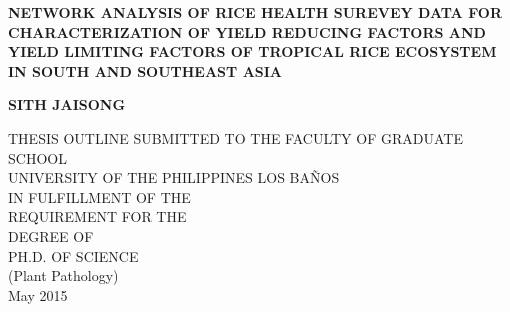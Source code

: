 \pagestyle{empty}

\begin{titlepage}
        \begin{center}
        \vspace*{2.0cm}

        \normalsize
        {\bf NETWORK ANALYSIS OF RICE HEALTH SUREVEY DATA FOR CHARACTERIZATION OF YIELD REDUCING FACTORS AND YIELD LIMITING FACTORS OF TROPICAL RICE ECOSYSTEM IN SOUTH AND SOUTHEAST ASIA}

        \vspace*{4.0cm}

        \normalsize
        \bf{SITH JAISONG} \\

        \vspace*{4.0cm}

        \normalsize
        THESIS OUTLINE SUBMITTED TO THE FACULTY OF GRADUATE SCHOOL\\
        UNIVERSITY OF THE PHILIPPINES LOS BA\~NOS\\ 
 IN FULFILLMENT OF THE \\
        REQUIREMENT FOR THE \\ 
        DEGREE OF \\
        \vspace*{2.0cm}
        PH.D. OF SCIENCE \\
        (Plant Pathology) \\

        \vspace*{1.0cm}
        May 2015
        \end{center}
\end{titlepage}

\pagestyle{plain}
\setcounter{page}{2}

\cleardoublepage %
 
